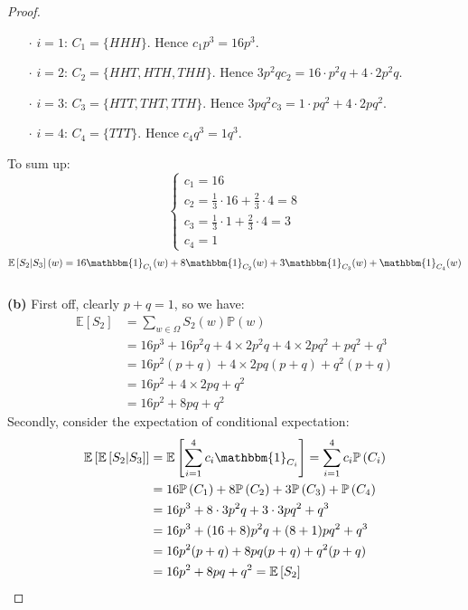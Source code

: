 \documentclass[a4paper, 10pt]{article}
\theoremstyle{definition}
\theoremstyle{hSol}
\begin{document}
\begin{proof}
\begin{itemize}
	\item[$\cdot$] $i=1$: $C_1 = \{HHH\}$. Hence $c_1p^3 = 16p^3$.
	\item[$\cdot$] $i=2$: $C_2 = \{HHT, HTH, THH\}$. Hence $3p^2qc_2  = 16\cdot p^2q + 4\cdot 2p^2q$.
	\item[$\cdot$] $i=3$: $C_3 = \{HTT, THT, TTH\}$. Hence $3pq^2c_3 = 1\cdot pq^2 + 4\cdot 2pq^2$.
	\item[$\cdot$] $i=4$: $C_4 = \{TTT\}$. Hence $c_4q^3 = 1q^3$.
\end{itemize}
To sum up:
\begin{equation}
	\begin{cases}
	c_1 = 16 \\
	c_2 = \frac{1}{3}\cdot 16 + \frac{2}{3}\cdot 4 = 8\\
	c_3 = \frac{1}{3}\cdot 1 + \frac{2}{3}\cdot 4 = 3\\
	c_4 = 1
	\end{cases}
\end{equation}
\begin{equation}
	\mathbb{E}\left[S_2\middle|S_3\right](w) = 16 \mathbbm{1}_{C_1}(w) + 8 \mathbbm{1}_{C_2}(w) + 3 \mathbbm{1}_{C_3}(w) + \mathbbm{1}_{C_4}(w)
\end{equation}
~\\
\textbf{(b)} First off, clearly $p+q=1$, so we have:
\begin{equation}
	\begin{split}
	\mathbb{E}\left[S_2\right] &= \sum_{w \in \Omega} S_2(w) \mathbb{P}\left(w\right) \\
	&= 16 p^3 + 16p^2q + 4 \times 2p^2q + 4 \times 2pq^2 + pq^2 + q^3 \\
	&=16p^2(p+q) + 4 \times 2pq(p+q) + q^2(p+q)\\
	&= 16p^2 + 4\times 2pq + q^2 \\
	&= 16p^2 + 8pq + q^2
	\end{split}
\end{equation}
Secondly, consider the expectation of conditional expectation:
\begin{equation}
	\begin{split}
		\mathbb{E}\left[\mathbb{E}\left[S_2\middle|S_3\right]\right] &= \mathbb{E}\left[\sum_{i=1}^4c_i \mathbbm{1}_{C_i}\right] = \sum_{i=1}^4 c_i \mathbb{P}\left(C_i\right)\\
		&=16 \mathbb{P}\left(C_1\right)+8\mathbb{P}\left(C_2\right)+3\mathbb{P}\left(C_3\right)+\mathbb{P}\left(C_4\right)\\
		&= 16p^3 + 8\cdot 3p^2q + 3\cdot 3pq^2 + q^3\\
		&= 16p^3 + (16+8)p^2q + (8+1)pq^2 + q^3\\
		&=16p^2(p+q) + 8pq(p+q) + q^2(p+q)\\
		&=16p^2 + 8pq + q^2 = \mathbb{E}\left[S_2\right]
	\end{split}
\end{equation}
\end{proof}
\end{document}
